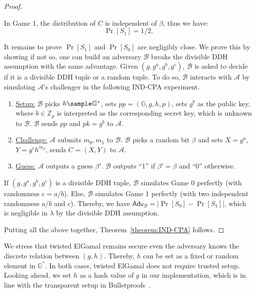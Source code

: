\documentclass[a4paper,10pt]{article}
\begin{document}
\begin{proof}
\begin{trivlist}
\item In Game 1, the distribution of $C$ is independent of $\beta$, thus we have:
\begin{equation*}
    \Pr[S_1] = 1/2.
\end{equation*}
\end{trivlist}

It remains to prove $\Pr[S_1]$ and $\Pr[S_0]$ are negligibly close. 
We prove this by showing if not so, one can build an adversary $\mathcal{B}$ breaks the divisible DDH assumption 
with the same advantage. Given $(g, g^a, g^b, g^c)$, 
$\mathcal{B}$ is asked to decide if it is a divisible DDH tuple or a random tuple. 
To do so, $\mathcal{B}$ interacts with $\mathcal{A}$ by simulating $\mathcal{A}$'s challenger 
in the following IND-CPA experiment. 
\begin{enumerate}
\item \underline{Setup:} $\mathcal{B}$ picks $h \sample \mathbb{G}^*$, sets $pp = (\mathbb{G}, g, h, p)$, 
    sets $g^b$ as the public key, where $b \in \mathbb{Z}_p$ is interpreted as the corresponding secret key, 
    which is unknown to $\mathcal{B}$. $\mathcal{B}$ sends $pp$ and $pk = g^b$ to $\mathcal{A}$. 

\item \underline{Challenge:} $\mathcal{A}$ submits $m_0, m_1$ to $\mathcal{B}$. 
    $\mathcal{B}$ picks a random bit $\beta$ 
    and sets $X = g^a$, $Y = g^c h^{m_\beta}$, sends $C = (X, Y)$ to $\mathcal{A}$.  

\item \underline{Guess:} $\mathcal{A}$ outputs a guess $\beta'$. 
    $\mathcal{B}$ outputs ``1'' if $\beta' = \beta$ and ``0'' otherwise.  
\end{enumerate}   
If $(g, g^a, g^b, g^c)$ is a divisible DDH tuple, 
$\mathcal{B}$ simulates Game 0 perfectly (with randomness $c = a/b$).  
Else, $\mathcal{B}$ simulates Game 1 perfectly (with two independent randomness $a/b$ and $c$). 
Thereby, we have $\mathsf{Adv}_\mathcal{B} = |\Pr[S_0] - \Pr[S_1]|$, 
which is negligible in $\lambda$ by the divisible DDH assumption. 

Putting all the above together, Theorem~\ref{theorem:IND-CPA} follows.  
\end{proof}

\begin{remark}
We stress that twisted ElGamal remains secure even the adversary knows the discrete relation between $(g, h)$. 
Thereby, $h$ can be set as a fixed or random element in $\mathbb{G}^*$.   
In both cases, twisted ElGamal does not require trusted setup. 
Looking ahead, we set $h$ as a hash value of $g$ in our implementation, 
which is in line with the transparent setup in Bulletproofs~\cite{BulletProof2018}.   
\end{remark}
\end{document}
